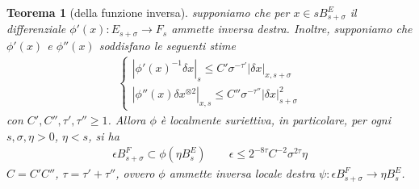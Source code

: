 \documentclass[twoside, 11pt]{amsbook}
\newcommand{\0}{{(0)}}
\newcommand{\3}{{(3)}}
\theoremstyle{colonplain}
\newtheorem{thm}{Teorema}[chapter]
\theoremstyle{colondefinition}
\theoremstyle{colonremark}
\numberwithin{equation}{chapter}
\begin{document}
\begin{thm}[della funzione inversa]\label{InvFunctThm} supponiamo che per $x \in sB^E_{s + \sigma}$ il differenziale $\phi'(x) : E_{s + \sigma} \longrightarrow F_s$ ammette inversa destra. Inoltre, supponiamo che $\phi'(x)$ e $\phi''(x)$ soddisfano le seguenti stime
\begin{align}\label{InvDiff&SecDiff Est}
    \begin{cases}
        |\phi'(x)^{-1}\delta x|_s \leq C'\sigma^{-\tau'}|\delta x|_{x, s + \sigma} \\
        |\phi''(x)\delta x^{\otimes 2}|_{x, s} \leq C''\sigma^{-\tau''}|\delta x|^2_{s + \sigma}
    \end{cases} 
\end{align}
con $C', C'', \tau', \tau'' \geq 1$. Allora $\phi$ è localmente suriettiva, in particolare, per ogni $s, \sigma, \eta > 0$, $\eta < s$, si ha
\begin{align}
    \epsilon B^F_{s + \sigma} \subset \phi(\eta B^E_s) \qquad \epsilon \leq 2^{-8\tau}C^{-2}\sigma^{2\tau}\eta 
\end{align}
$C = C'C''$, $\tau = \tau' + \tau''$, ovvero $\phi$ ammette inversa locale destra $\psi : \epsilon B^F_{s + \sigma} \longrightarrow \eta B^E_s$.
\end{thm}
\end{document}
